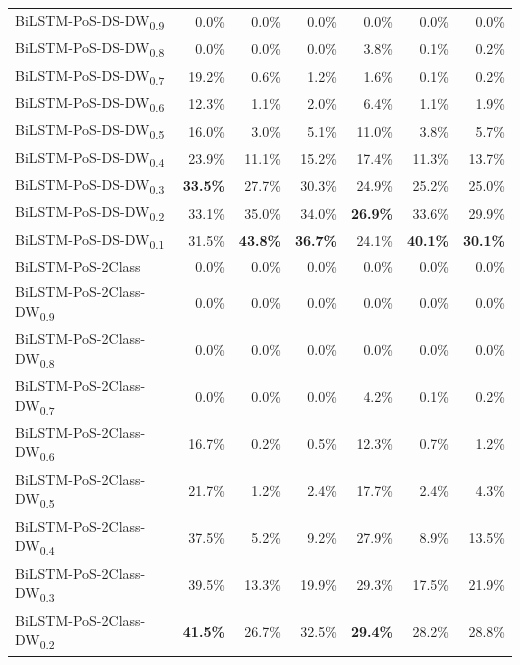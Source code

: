 \documentclass[11pt,a4paper]{article}
\begin{document}
\begin{table}
\begin{tabular}{lrrrrrr}
        BiLSTM-PoS-DS-DW\textsubscript{0.9} &  0.0\% &  0.0\% &  0.0\% &  0.0\% &  0.0\% &  0.0\% \\
        BiLSTM-PoS-DS-DW\textsubscript{0.8} &  0.0\% &  0.0\% &  0.0\% &  3.8\% &  0.1\% &  0.2\% \\
        BiLSTM-PoS-DS-DW\textsubscript{0.7} & 19.2\% &  0.6\% &  1.2\% &  1.6\% &  0.1\% &  0.2\% \\
        BiLSTM-PoS-DS-DW\textsubscript{0.6} & 12.3\% &  1.1\% &  2.0\% &  6.4\% &  1.1\% &  1.9\% \\
        BiLSTM-PoS-DS-DW\textsubscript{0.5} & 16.0\% &  3.0\% &  5.1\% & 11.0\% &  3.8\% &  5.7\% \\
        BiLSTM-PoS-DS-DW\textsubscript{0.4} & 23.9\% & 11.1\% & 15.2\% & 17.4\% & 11.3\% & 13.7\% \\
        BiLSTM-PoS-DS-DW\textsubscript{0.3} & \textbf{33.5\%} & 27.7\% & 30.3\% & 24.9\% & 25.2\% & 25.0\% \\
        BiLSTM-PoS-DS-DW\textsubscript{0.2} & 33.1\% & 35.0\% & 34.0\% & \textbf{26.9\%} & 33.6\% & 29.9\% \\
        BiLSTM-PoS-DS-DW\textsubscript{0.1} & 31.5\% & \textbf{43.8\%} & \textbf{36.7\%} & 24.1\% & \textbf{40.1\%} & \textbf{30.1\%} \\
        \hline
        BiLSTM-PoS-2Class & 0.0\% & 0.0\% & 0.0\% & 0.0\% & 0.0\% & 0.0\% \\
        BiLSTM-PoS-2Class-DW\textsubscript{0.9} &  0.0\% &  0.0\% &  0.0\% &  0.0\% &  0.0\% &  0.0\% \\
        BiLSTM-PoS-2Class-DW\textsubscript{0.8} &  0.0\% &  0.0\% &  0.0\% &  0.0\% &  0.0\% &  0.0\% \\
        BiLSTM-PoS-2Class-DW\textsubscript{0.7} &  0.0\% &  0.0\% &  0.0\% &  4.2\% &  0.1\% &  0.2\% \\
        BiLSTM-PoS-2Class-DW\textsubscript{0.6} & 16.7\% &  0.2\% &  0.5\% & 12.3\% &  0.7\% &  1.2\% \\
        BiLSTM-PoS-2Class-DW\textsubscript{0.5} & 21.7\% &  1.2\% &  2.4\% & 17.7\% &  2.4\% &  4.3\% \\
        BiLSTM-PoS-2Class-DW\textsubscript{0.4} & 37.5\% &  5.2\% &  9.2\% & 27.9\% &  8.9\% & 13.5\% \\
        BiLSTM-PoS-2Class-DW\textsubscript{0.3} & 39.5\% & 13.3\% & 19.9\% & 29.3\% & 17.5\% & 21.9\% \\
        BiLSTM-PoS-2Class-DW\textsubscript{0.2} & \textbf{41.5\%} & 26.7\% & 32.5\% & \textbf{29.4\%} & 28.2\% & 28.8\% \\

\end{tabular}
\end{table}
\end{document}
